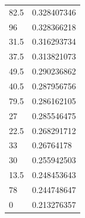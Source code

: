 \begin{longtable}{|l|l|}
	\rowcolor[HTML]{F8FF00} 
	82.5                                                    & 0.328407346                                                   \\
	\rowcolor[HTML]{F8FF00} 
	96                                                      & 0.328366218                                                   \\
	\rowcolor[HTML]{F8FF00} 
	31.5                                                    & 0.316293734                                                   \\
	\rowcolor[HTML]{F8FF00} 
	37.5                                                    & 0.313821073                                                   \\
	\rowcolor[HTML]{F8FF00} 
	49.5                                                    & 0.290236862                                                   \\
	\rowcolor[HTML]{F8FF00} 
	40.5                                                    & 0.287956756                                                   \\
	\rowcolor[HTML]{F8FF00} 
	79.5                                                    & 0.286162105                                                   \\
	\rowcolor[HTML]{F8FF00} 
	27                                                      & 0.285546475                                                   \\
	\rowcolor[HTML]{F8FF00} 
	22.5                                                    & 0.268291712                                                   \\
	\rowcolor[HTML]{F8FF00} 
	33                                                      & 0.26764178                                                    \\
	\rowcolor[HTML]{F8FF00} 
	30                                                      & 0.255942503                                                   \\
	\rowcolor[HTML]{F8FF00} 
	13.5                                                    & 0.248453643                                                   \\
	\rowcolor[HTML]{F8FF00} 
	78                                                      & 0.244748647                                                   \\
	\rowcolor[HTML]{F8FF00} 
	0                                                       & 0.213276357                                                   \\

\end{longtable}
